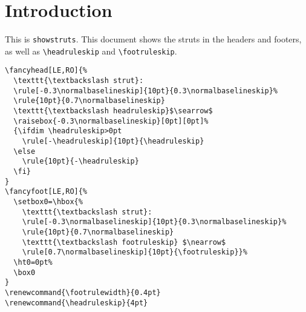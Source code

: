 \documentclass[twoside]{article}
\renewcommand{\footrulewidth}{0.4pt}
\renewcommand{\headruleskip}{4pt}
\begin{document}
\section{Introduction}
\label{sec:introduction}

\noindent
\begin{boxedminipage}{\textwidth}
This is \texttt{showstruts}.
This document shows the struts in the headers and footers, as well as \verb|\headruleskip| and \verb|\footruleskip|.

\begin{verbatim}
\fancyhead[LE,RO]{%
  \texttt{\textbackslash strut}:
  \rule[-0.3\normalbaselineskip]{10pt}{0.3\normalbaselineskip}%
  \rule{10pt}{0.7\normalbaselineskip}
  \texttt{\textbackslash headruleskip}$\searrow$
  \raisebox{-0.3\normalbaselineskip}[0pt][0pt]%
  {\ifdim \headruleskip>0pt
    \rule[-\headruleskip]{10pt}{\headruleskip}
  \else
    \rule{10pt}{-\headruleskip}
  \fi}
}
\fancyfoot[LE,RO]{%
  \setbox0=\hbox{%
    \texttt{\textbackslash strut}:
    \rule[-0.3\normalbaselineskip]{10pt}{0.3\normalbaselineskip}%
    \rule{10pt}{0.7\normalbaselineskip}
    \texttt{\textbackslash footruleskip} $\nearrow$
    \rule[0.7\normalbaselineskip]{10pt}{\footruleskip}}%
  \ht0=0pt%
  \box0
}
\renewcommand{\footrulewidth}{0.4pt}
\renewcommand{\headruleskip}{4pt}
\end{verbatim}

\end{boxedminipage}

\bigskip

\lipsum
\end{document}
